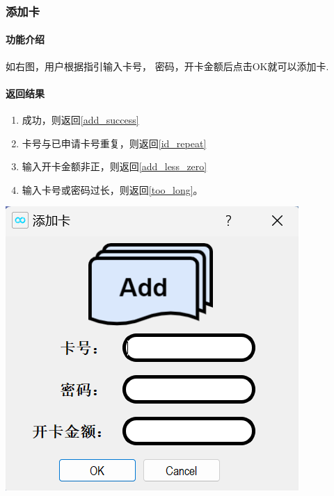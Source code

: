 \documentclass{article}
\begin{document}
    \subsubsection{添加卡}
    \begin{minipage}[h]{0.5\linewidth}
        \paragraph{功能介绍}
        如右图，用户根据指引输入卡号，
        密码，开卡金额后点击OK就可以添加卡.
        \vfill
        \paragraph{返回结果}
        \begin{enumerate}
            \item 成功，则返回\ref{add_success}
            \item 卡号与已申请卡号重复，则返回\ref{id_repeat}
            \item 输入开卡金额非正，则返回\ref{add_less_zero}
            \item 输入卡号或密码过长，则返回\ref{too_long}。
        \end{enumerate}
    \end{minipage}
    \begin{minipage}[h]{0.5\linewidth}
        \centering
        \includegraphics[scale=0.6]{figure/add.png}
        \label{add}
    \end{minipage}
\end{document}
